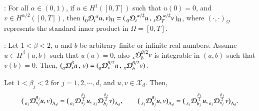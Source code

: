 %
\begin{lem}
	\label{Lem: left frac proj}
	\cite{Li2009}: For all $\alpha \in  (0,1)$, if $u \in H^1([0,T])$ such that $u(0)=0$, and $v \in H^{\alpha/2}([0,T])$, then $( \prescript{}{0}{ \mathcal{D}}_{t}^{\,\,\alpha} u, v )_{\Omega} =  (\, \prescript{}{0}{ \mathcal{D}}_{t}^{\,\,\alpha/2} u \,,\, \prescript{}{t}{ \mathcal{D}}_{T}^{\,\,\alpha/2} v\, )_{\Omega}$, where $(\cdot , \cdot)_{\Omega}$ represents the standard inner product in $\Omega=[0,T]$. 
\end{lem}
%
%
\begin{lem}
	\label{Lem: fractional integ-by-parts 1 and 2}
	\cite{kharazmi2017petrov}: Let $1 < \beta < 2$, $a$ and $b$ be arbitrary finite or infinite real numbers. Assume $u \in H^{\beta}(a,b)$ such that $u(a)=0$, also $\prescript{}{x}{\mathcal{D}}_{b}^{\beta/2}v$ is integrable in $(a,b)$ such that $v(b) = 0$. Then, $( \prescript{}{a}{\mathcal{D}}_{x}^{\beta} u \,,\,v ) = ( \prescript{}{a}{\mathcal{D}}_{x}^{\beta/2} u \,,\,\prescript{}{x}{\mathcal{D}}_{b}^{\beta/2} v )$.
\end{lem}
%
%
\begin{lem}
	\label{lem_generalize}
	Let $1<\beta_j<2$ for $j=1,2,\cdots,d$, and $u,v \in  \mathcal{X}_d$. Then,  
	\begin{align*}
	\big(\prescript{}{a_j}{\mathcal{D}}_{x_j}^{\beta_j} u, v\big)_{\Lambda_d}=\big(\prescript{}{a_j}{\mathcal{D}}_{x_j}^{\frac{\beta_j}{2}} u, \prescript{}{x_j}{\mathcal{D}}_{b_j}^{\frac{\beta_j}{2}} v\big)_{\Lambda_d},
	\qquad
	\big(\prescript{}{x_j}{\mathcal{D}}_{b_j}^{\beta_j} u, v\big)_{\Lambda_d}=\big(\prescript{}{x_j}{\mathcal{D}}_{b_j}^{\frac{\beta_j}{2}} u, \prescript{}{a_j}{\mathcal{D}}_{x_j}^{\frac{\beta_j}{2}} v\big)_{\Lambda_d}.
	\end{align*}
\end{lem}
%



